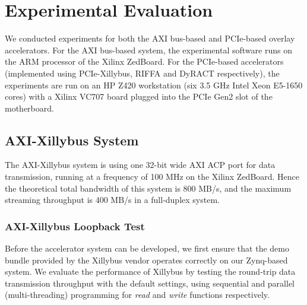 \section{Experimental Evaluation}
\label{section_5}
We conducted experiments for both the AXI bus-based and PCIe-based overlay accelerators.  
For the AXI bus-based system, the experimental software runs on the ARM processor of the Xilinx ZedBoard. 
For the PCIe-based accelerators (implemented using PCIe-Xillybus, RIFFA and DyRACT respectively), the experiments are run on an HP Z420 workstation (six 3.5 GHz Intel Xeon E5-1650 cores) with a Xilinx VC707 board plugged into the PCIe Gen2 slot of the motherboard. 

\subsection{AXI-Xillybus System}
The AXI-Xillybus system is using one 32-bit wide AXI ACP port for data transmission, running at a frequency of 100 MHz on the Xilinx ZedBoard. 
Hence the theoretical total bandwidth of this system is 800 MB/s, and the maximum streaming throughput is 400 MB/s in a full-duplex system. 

\subsubsection{AXI-Xillybus Loopback Test}
Before the accelerator system can be developed, we first ensure that the demo bundle provided by the Xillybus vendor operates correctly on our Zynq-based system. 
We evaluate the performance of Xillybus by testing the round-trip data transmission throughput with the default settings, using sequential and parallel (multi-threading) programming for \textit{read} and \textit{write} functions respectively. 

